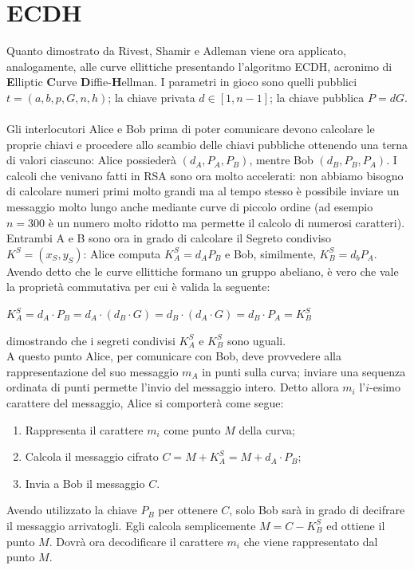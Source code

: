 \documentclass[a4paper,12pt]{tesiinfo}
\begin{document}
\section{ECDH}
Quanto dimostrato da Rivest, Shamir e Adleman viene ora applicato, analogamente, alle curve ellittiche presentando l'algoritmo ECDH, acronimo di \textbf{E}lliptic \textbf{C}urve \textbf{D}iffie-\textbf{H}ellman.
I parametri in gioco sono quelli pubblici $t= (a, b, p, G, n, h)$; la chiave privata $d \in [1, n-1]$; la chiave pubblica $P = dG$. 
\\
\\
Gli interlocutori Alice e Bob prima di poter comunicare devono calcolare le proprie chiavi e procedere allo scambio delle chiavi pubbliche ottenendo una terna di valori ciascuno: Alice possieder\`a $(d_A, P_A, P_B)$, mentre Bob $(d_B, P_B, P_A)$. I calcoli che venivano fatti in RSA sono ora molto accelerati: non abbiamo bisogno di calcolare numeri primi molto grandi ma al tempo stesso \`e possibile inviare un messaggio molto lungo anche mediante curve di piccolo ordine (ad esempio $n=300$ \`e un numero molto ridotto ma permette il calcolo di numerosi caratteri).
\\
Entrambi A e B sono ora in grado di calcolare il Segreto condiviso $K^S = (x_S, y_S)$: Alice computa $K_A^S = d_AP_B$ e Bob, similmente, $K_B^S = d_bP_A$. Avendo detto che le curve ellittiche formano un gruppo abeliano, \`e vero che vale la propriet\`a commutativa per cui \`e valida la seguente:
\begin{center}
 $K_A^S = d_A \cdot P_B = d_A \cdot (d_B \cdot G) = d_B \cdot (d_A \cdot G) = d_B \cdot P_A = K_B^S$
\end{center}
dimostrando che i segreti condivisi $K_A^S$ e $K_B^S$ sono uguali.
\\
A questo punto Alice, per comunicare con Bob, deve provvedere alla rappresentazione del suo messaggio $m_A$ in punti sulla curva; inviare una sequenza ordinata di punti permette l'invio del messaggio intero. Detto allora $m_i$ l'$i$-esimo carattere del messaggio, Alice si comporter\`a come segue:
\begin{enumerate}
 \item Rappresenta il carattere $m_i$ come punto $M$ della curva;
 \item Calcola il messaggio cifrato $C = M + K_A^S=M+d_A \cdot P_B $;
 \item Invia a Bob il messaggio $C$.
\end{enumerate}
Avendo utilizzato la chiave $P_B$ per ottenere $C$, solo Bob sar\`a in grado di decifrare il messaggio arrivatogli. Egli calcola semplicemente $M = C - K_B^S$ ed ottiene il punto $M$. Dovr\`a ora decodificare il carattere $m_i$ che viene rappresentato dal punto $M$.
\end{document}
